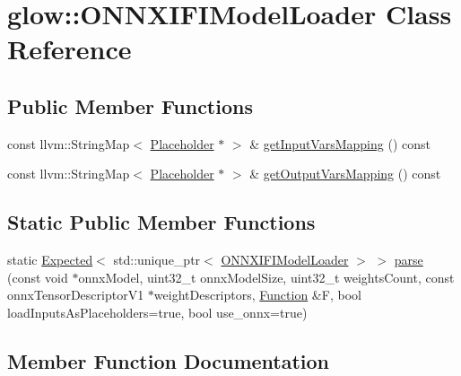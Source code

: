 \hypertarget{classglow_1_1_o_n_n_x_i_f_i_model_loader}{}\section{glow\+:\+:O\+N\+N\+X\+I\+F\+I\+Model\+Loader Class Reference}
\label{classglow_1_1_o_n_n_x_i_f_i_model_loader}
\subsection*{Public Member Functions}
\begin{DoxyCompactItemize}
\item 
const llvm\+::\+String\+Map$<$ \hyperlink{classglow_1_1_placeholder}{Placeholder} $\ast$ $>$ \& \hyperlink{classglow_1_1_o_n_n_x_i_f_i_model_loader_af9d4f9219dece20a56eb9c451793393c}{get\+Input\+Vars\+Mapping} () const
\item 
const llvm\+::\+String\+Map$<$ \hyperlink{classglow_1_1_placeholder}{Placeholder} $\ast$ $>$ \& \hyperlink{classglow_1_1_o_n_n_x_i_f_i_model_loader_a67e7b300f2c54583abeae36d53b5a51f}{get\+Output\+Vars\+Mapping} () const
\end{DoxyCompactItemize}
\subsection*{Static Public Member Functions}
\begin{DoxyCompactItemize}
\item 
static \hyperlink{classglow_1_1detail_1_1_glow_expected}{Expected}$<$ std\+::unique\+\_\+ptr$<$ \hyperlink{classglow_1_1_o_n_n_x_i_f_i_model_loader}{O\+N\+N\+X\+I\+F\+I\+Model\+Loader} $>$ $>$ \hyperlink{classglow_1_1_o_n_n_x_i_f_i_model_loader_a8b1db52c069d59cf77865c6cae6af5cd}{parse} (const void $\ast$onnx\+Model, uint32\+\_\+t onnx\+Model\+Size, uint32\+\_\+t weights\+Count, const onnx\+Tensor\+Descriptor\+V1 $\ast$weight\+Descriptors, \hyperlink{classglow_1_1_function}{Function} \&F, bool load\+Inputs\+As\+Placeholders=true, bool use\+\_\+onnx=true)
\end{DoxyCompactItemize}


\subsection{Member Function Documentation}
\mbox{\label{classglow_1_1_o_n_n_x_i_f_i_model_loader_af9d4f9219dece20a56eb9c451793393c}} 
